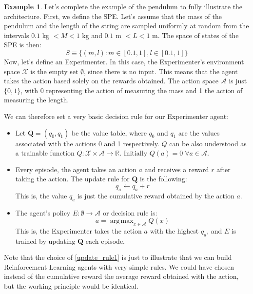 \documentclass[11pt,a4paper,twoside]{report}
\DeclareMathOperator*{\argmax}{arg\,max}
\newcommand{\+}{\textnormal{+} }
\theoremstyle{definition}
\newtheorem{myex}[mythm]{Example}
\numberwithin{equation}{chapter}
\begin{document}
\begin{myex}
Let's complete the example of the pendulum to fully illustrate the architecture.
First, we define the SPE. Let's assume that the mass of the pendulum and the
length of the string are sampled uniformly at random from the intervals \break
$0.1$ kg $< M < 1$ kg and $ 0.1$ m $<L<1 $ m. The space of states of the SPE
is then:
 \begin{equation}
  S\equiv \{(m,l):m \in \left[0.1, 1\right],l \in [0.1,1]\}
 \end{equation}
Now, let's define an Experimenter. In this case, the Experimenter's environment
space $\mathcal{X}$ is the empty set $\emptyset$, since there is no input. This
means that the agent takes the action based solely on the rewards obtained. The
action space $\mathcal{A}$ is just $\{0,1\}$, with 0 representing the action of
measuring the mass and 1 the action of measuring the length.

We can therefore set a very basic decision rule for our Experimenter agent:

\begin{itemize}
  \item Let $\textbf{Q}=(q_0,q_1)$ be the value table, where $q_0$ and $q_1$ are
  the values associated with the actions 0 and 1 respectively.  $Q$ can be also
  understood as a trainable function $Q:\mathcal{X}\times\mathcal{A} \rightarrow
  \mathbb{R}$. Initially $Q(a)=0 \; \forall a \in \mathcal{A}$. 
  \item  Every episode, the agent takes an action $a$ and receives a reward $r$
  after taking the action.
  The update rule for $\textbf{Q}$ is the following:
  \begin{equation}
    q_a\leftarrow q_a + r
    \label{update_rule1}
  \end{equation}
  This is, the value $q_a$ is just the cumulative reward obtained by the 
  action $a$. 
  \item The agent's policy $E:\emptyset  \rightarrow \mathcal{A}$ or 
  decision rule is:
  \begin{equation}
    a = \argmax_{x \in \mathcal{A}} Q(x)
    \label{argmax_policy}
  \end{equation}
  This is, the Experimenter takes the action $a$ with the highest $q_a$, and 
  $E$ is trained by updating $\textbf{Q}$ each episode.
\end{itemize}

Note that the choice of \eqref{update_rule1} is just to illustrate that we can
build Reinforcement Learning agents with very simple rules. We could have
chosen instead of the cumulative reward the average reward obtained with the 
action, but the working principle would be identical.


\end{myex}
\end{document}
